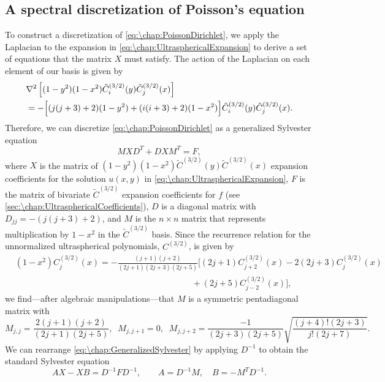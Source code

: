 \subsection{A spectral discretization of Poisson's equation}
To construct a discretization of \cref{eq:\chap:PoissonDirichlet}, we apply the Laplacian to the expansion in \cref{eq:\chap:UltrasphericalExpansion} to derive a set of equations that the 
matrix $X$ must satisfy.  The action of the Laplacian on each element of our basis is given by 
\begin{equation}
\begin{aligned}
&\nabla^2\left[(1-y^2)(1-x^2)\tilde{C}^{(3/2)}_i(y)\tilde{C}^{(3/2)}_j(x)\right] \\
&= -\Bigl[(j(j+3)+2)(1-y^2)+(i(i+3)+2)(1-x^2)\Bigr]\tilde{C}^{(3/2)}_i(y)\tilde{C}^{(3/2)}_j(x).
\end{aligned}
\label{eq:\chap:LaplacianIdentity}
\end{equation}
Therefore, we can discretize \cref{eq:\chap:PoissonDirichlet} as a generalized Sylvester equation
\begin{equation}
M X D^T + D X M^T = F,
\label{eq:\chap:GeneralizedSylvester}
\end{equation}
where $X$ is the matrix of $(1-y^2)(1-x^2)\tilde{C}^{(3/2)}(y)\tilde{C}^{(3/2)}(x)$ expansion coefficients for the solution $u(x,y)$ in \cref{eq:\chap:UltrasphericalExpansion}, $F$ is the matrix of bivariate $\tilde{C}^{(3/2)}$ expansion coefficients for $f$ (see \cref{sec:\chap:UltrasphericalCoefficients}), $D$ is a diagonal matrix with $D_{jj} = -(j(j+3)+2)$, and $M$ is the $n\times n$ matrix that represents multiplication by $1-x^2$ in the $\tilde{C}^{(3/2)}$ basis. Since the recurrence relation for the unnormalized ultraspherical polynomials, $C^{(3/2)}$, is given by~\cite[(18.9.7) \& (18.9.8)]{NISTHandbook}
\[
\begin{aligned}
&(1-x^2)C^{(3/2)}_j\!(x) = -\frac{(j+1)(j+2)}{(2j+1)(2j+3)(2j+5)}\!\bigg[(2j+1)C^{(3/2)}_{j+2}\!(x) - 2(2j+3)C^{(3/2)}_{j}\!(x)
\\[-0.4em]
&\qquad\qquad\qquad\qquad\qquad\qquad\qquad\qquad\qquad\qquad\;\;+ (2j+5)C^{(3/2)}_{j-2}\!(x)\bigg],
\end{aligned}
\]
we find---after algebraic manipulations---that $M$ is a symmetric pentadiagonal matrix with
\begin{equation} 
M_{j,j} = \frac{2(j+1)(j+2)}{(2j+1)(2j+5)},  \;\; M_{j,j+1} = 0, \;\; M_{j,j+2} = \frac{-1}{(2j+3)(2j+5)}\sqrt{\frac{(j+4)!(2j+3)}{j!(2j+7)}}.
\label{eq:\chap:UltraSmultiplication} 
\end{equation} 
We can rearrange \cref{eq:\chap:GeneralizedSylvester} by applying $D^{-1}$ to obtain the standard Sylvester equation
 \begin{equation}
AX - XB = D^{-1} F D^{-1}, \qquad A = D^{-1}M, \quad B = -M^TD^{-1}.
\label{eq:\chap:Sylvester}
\end{equation}

